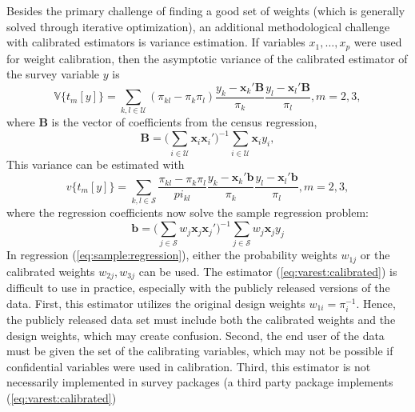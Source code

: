 Besides the primary challenge of finding a good set of weights
(which is generally solved through iterative optimization),
an additional methodological challenge with calibrated estimators
is variance estimation. If variables $x_1,\ldots,x_p$ were used
for weight calibration, then the asymptotic variance of the calibrated
estimator of the survey variable $y$ is
\begin{equation}
    \mathbb{V}\bigl\{t_{m}[y]\bigr\} = \sum_{k,l \in \mathcal{U}}
        (\pi_{kl}-\pi_k \pi_l)
        \frac{y_k - \mathbf{x}_k ' \mathbf{B}}{\pi_k}
        \frac{y_l - \mathbf{x}_l ' \mathbf{B}}{\pi_l}, m=2,3,
    \label{eq:var:calibrated}
\end{equation}
where $\mathbf{B}$ is the vector of coefficients from the
census regression,
\begin{equation}
    \mathbf{B}
    = \bigl( \sum_{i \in \mathcal{U}} \mathbf{x}_i \mathbf{x}_i' )^{-1}
      \sum_{i \in \mathcal{U}} \mathbf{x}_i y_i
    \label{eq:census:regression},
\end{equation}
This variance can be estimated with
\begin{equation}
    v\bigl\{t_{m}[y]\bigr\} = \sum_{k,l \in \mathcal{S}}
        \frac{\pi_{kl}-\pi_k \pi_l}{pi_{kl}}
        \frac{y_k - \mathbf{x}_k ' \mathbf{b}}{\pi_k}
        \frac{y_l - \mathbf{x}_l ' \mathbf{b}}{\pi_l}, m=2,3,
    \label{eq:varest:calibrated}
\end{equation}
where the regression coefficients now solve the sample
regression problem:
\begin{equation}
    \mathbf{b}
    = \bigl( \sum_{j \in \mathcal{S}} w_j \mathbf{x}_j \mathbf{x}_j' )^{-1}
      \sum_{j \in \mathcal{S}} w_j \mathbf{x}_j y_j
    \label{eq:sample:regression}
\end{equation}
In regression (\ref{eq:sample:regression}), 
either the probability weights $w_{1j}$ or the calibrated weights
$w_{2j}, w_{3j}$ can be used. The estimator (\ref{eq:varest:calibrated})
is difficult to use in practice, especially with the publicly released
versions of the data. First, this estimator utilizes the original design weights
$w_{1i}=\pi_i^{-1}$. Hence, the publicly released data set must include 
both the calibrated weights and the design weights, which may create 
confusion. Second, the end user
of the data must be given the set of the calibrating variables, which may
not be possible if confidential variables were used in calibration. Third,
this estimator is not necessarily implemented in survey packages
(a third party package  implements (\ref{eq:varest:calibrated})
